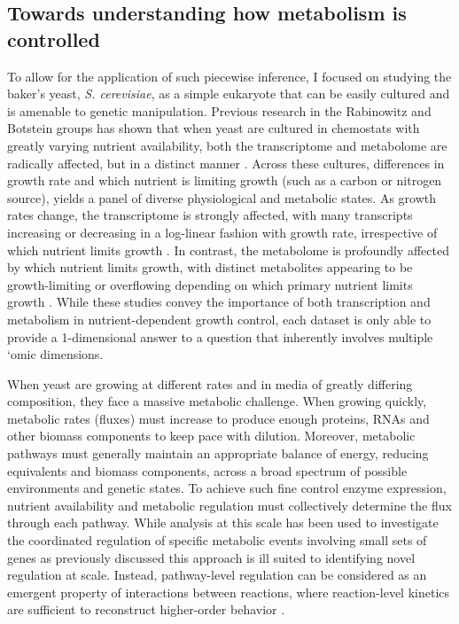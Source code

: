 \subsection{Towards understanding how metabolism is controlled}

To allow for the application of such piecewise inference, I focused on studying the baker's yeast, \textit{S. cerevisiae}, as a simple eukaryote that can be easily cultured and is amenable to genetic manipulation. Previous research in the Rabinowitz and Botstein groups has shown that when yeast are cultured in chemostats with greatly varying nutrient availability, both the transcriptome and metabolome are radically affected, but in a distinct manner \cite{Brauer:2008jn, Boer:2010fb}. Across these cultures, differences in growth rate and which nutrient is limiting growth (such as a carbon or nitrogen source), yields a panel of diverse physiological and metabolic states. As growth rates change, the transcriptome is strongly affected, with many transcripts increasing or decreasing in a log-linear fashion with growth rate, irrespective of which nutrient limits growth \cite{Brauer:2008jn}. In contrast, the metabolome is profoundly affected by which nutrient limits growth, with distinct metabolites appearing to be growth-limiting or overflowing depending on which primary nutrient limits growth \cite{Boer:2010fb}. While these studies convey the importance of both transcription and metabolism in nutrient-dependent growth control, each dataset is only able to provide a 1-dimensional answer to a question that inherently involves multiple `omic dimensions.

When yeast are growing at different rates and in media of greatly differing composition, they face a massive metabolic challenge. When growing quickly, metabolic rates (fluxes) must increase to produce enough  proteins, RNAs and other biomass components to keep pace with dilution.  Moreover, metabolic pathways must generally maintain an appropriate balance of energy, reducing equivalents and biomass components, across a broad spectrum of possible environments and genetic states. To achieve such fine control enzyme expression, nutrient availability and metabolic regulation must collectively determine the flux through each pathway.  While analysis at this scale has been used to investigate the coordinated regulation of specific metabolic events involving small sets of genes \cite{Zampar:2013fr, Link:2013dj} as previously discussed this approach is ill suited to identifying novel regulation at scale. Instead, pathway-level regulation can be considered as an emergent property of interactions between reactions, where reaction-level kinetics are sufficient to reconstruct higher-order behavior \cite{Fell:1997wg}.

